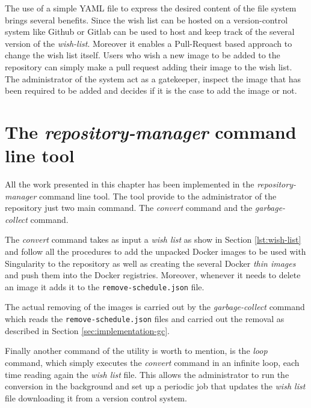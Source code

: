 The use of a simple YAML file to express the desired content of the file system
brings several benefits.  Since the wish list can be hosted on a
version-control system like Github or Gitlab can be used to host and keep track
of the several version of the \textit{wish-list}. Moreover it enables a
Pull-Request based approach to change the wish list itself. Users who wish a
new image to be added to the repository can simply make a pull request adding
their image to the wish list. The administrator of the system act as a
gatekeeper, inspect the image that has been required to be added and decides if it is the case to add
the image or not.

\section{The \textit{repository-manager} command line tool}

All the work presented in this chapter has been implemented in the
\textit{repository-manager} \cite{repository-manager} command line tool. The
tool provide to the administrator of the repository just two main command. The
\textit{convert} command and the \textit{garbage-collect} command.

The \textit{convert} command takes as input a \textit{wish list} as show in
Section \ref{lst:wish-list} and follow all the procedures to add the unpacked Docker
images to be used with Singularity to the repository as well as creating the
several Docker \textit{thin images} and push them into the Docker registries.
Moreover, whenever it needs to delete an image it adds it to the
\texttt{remove-schedule.json} file. 

The actual removing of the images is carried out by the
\textit{garbage-collect} command which reads the \texttt{remove-schedule.json}
files and carried out the removal as described in Section \ref{sec:implementation-gc}.

Finally another command of the utility is worth to mention, is the \textit{loop}
command, which simply executes the \textit{convert} command in an infinite loop, each
time reading again the \textit{wish list} file. This allows the administrator to
run the conversion in the background and set up a periodic job that updates the
\textit{wish list} file downloading it from a version control system.


